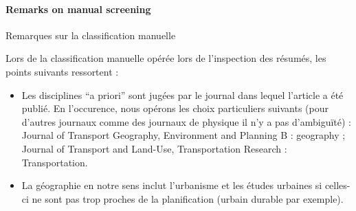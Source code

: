 





\paragraph{Remarks on manual screening}{Remarques sur la classification manuelle}

Lors de la classification manuelle opérée lors de l'inspection des résumés, les points suivants ressortent :

\begin{itemize}
	\item Les disciplines ``a priori'' sont jugées par le journal dans lequel l'article a été publié. En l'occurence, nous opérons les choix particuliers suivants (pour d'autres journaux comme des journaux de physique il n'y a pas d'ambiguïté) : Journal of Transport Geography, Environment and Planning B : geography ; Journal of Transport and Land-Use, Transportation Research : Transportation.
	\item La géographie en notre sens inclut l'urbanisme et les études urbaines si celles-ci ne sont pas trop proches de la planification (urbain durable par exemple).
\end{itemize}






